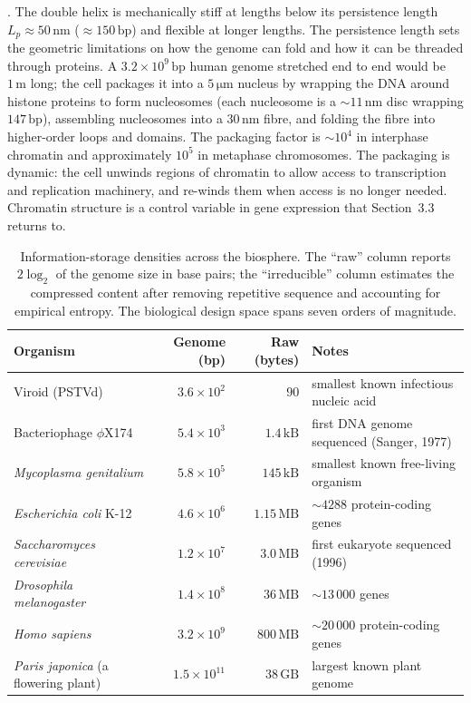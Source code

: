 . The double helix is
mechanically stiff at lengths below its persistence length
$L_p \approx 50\,\text{nm}$ ($\approx 150\,\text{bp}$) and flexible
at longer lengths. The persistence length sets the geometric
limitations on how the genome can fold and how it can be threaded
through proteins. A $3.2 \times 10^9\,\text{bp}$ human genome
stretched end to end would be $1\,\text{m}$ long; the cell packages it
into a $5\,\si{\micro\meter}$ nucleus by wrapping the DNA around
histone proteins to form nucleosomes (each nucleosome is a
$\sim 11\,\text{nm}$ disc wrapping $147\,\text{bp}$), assembling
nucleosomes into a $30\,\text{nm}$ fibre, and folding the fibre into
higher-order loops and domains. The packaging factor is
$\sim 10^4$ in interphase chromatin and approximately $10^5$ in
metaphase chromosomes. The packaging is dynamic: the cell unwinds
regions of chromatin to allow access to transcription and
replication machinery, and re-winds them when access is no longer
needed. Chromatin structure is a control variable in gene expression
that Section~3.3 returns to.

\begin{table}[h]
\centering
\caption{Information-storage densities across the biosphere. The
``raw'' column reports $2 \log_2$ of the genome size in base pairs;
the ``irreducible'' column estimates the compressed content after
removing repetitive sequence and accounting for empirical entropy.
The biological design space spans seven orders of magnitude.}
\label{tab:genome-sizes}
\small
\begin{tabular}{lrrl}
\toprule
Organism & Genome (bp) & Raw (bytes) & Notes \\
\midrule
Viroid (PSTVd)            & $3.6 \times 10^2$ & $90$           & smallest known infectious nucleic acid \\
Bacteriophage $\phi$X174  & $5.4 \times 10^3$ & $1.4\,\text{kB}$ & first DNA genome sequenced (Sanger, 1977) \\
\emph{Mycoplasma genitalium} & $5.8 \times 10^5$ & $145\,\text{kB}$ & smallest known free-living organism \\
\emph{Escherichia coli} K-12 & $4.6 \times 10^6$ & $1.15\,\text{MB}$ & $\sim 4288$ protein-coding genes \\
\emph{Saccharomyces cerevisiae} & $1.2 \times 10^7$ & $3.0\,\text{MB}$ & first eukaryote sequenced (1996) \\
\emph{Drosophila melanogaster} & $1.4 \times 10^8$ & $36\,\text{MB}$ & $\sim 13\,000$ genes \\
\emph{Homo sapiens}        & $3.2 \times 10^9$ & $800\,\text{MB}$ & $\sim 20\,000$ protein-coding genes \\
\emph{Paris japonica} (a flowering plant) & $1.5 \times 10^{11}$ & $38\,\text{GB}$ & largest known plant genome \\
\bottomrule
\end{tabular}
\end{table}

